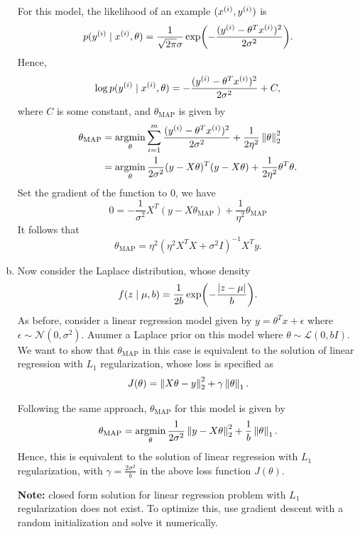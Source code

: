 \documentclass[12pt,letterpaper,boxed]{hmcpset}
\DeclareMathOperator*{\argmin}{argmin}
\newcommand{\thetamap}{\theta_{\mathrm{MAP}}}
\begin{document}
\begin{solution}
\begin{enumerate}[(a)]
    For this model, the likelihood of an example $(\xx, \yy)$ is
    \[
    p(\yy \mid \xx, \theta) = \frac{1}{\sqrt{2\pi} \sigma} \exp(-\frac{(\yy - \theta^T \xx)^2}{2\sigma^2}).
    \]
    Hence,
    \[
    \log p(\yy \mid \xx, \theta) = - \frac{(\yy - \theta^T \xx)^2}{2\sigma^2} + C,
    \]
    where $C$ is some constant, and $\theta_{\mathrm{MAP}}$ is given by
    \[
    \begin{aligned}
      \theta_{\mathrm{MAP}} &= \argmin_\theta \sum_{i=1}^m \frac{(\yy - \theta^T \xx)^2}{2\sigma^2} + \frac{1}{2\eta^2} \norm{\theta}_2^2 \\
      &= \argmin_\theta \frac{1}{2\sigma^2} (y - X\theta)^T (y - X\theta) + \frac{1}{2\eta^2} \theta^T \theta.
    \end{aligned}
    \]
    Set the gradient of the function to 0, we have
    \[
    0 = -\frac{1}{\sigma^2} X^T(y-X\thetamap) + \frac{1}{\eta^2} \thetamap
    \]
    It follows that
    \[
    \thetamap = \eta^2 (\eta^2 X^T X + \sigma^2 I)^{-1} X^T y.
    \]
    
    \item Now consider the Laplace distribution, whose density 
    \[
    f(z \mid \mu, b) = \frac{1}{2b} \exp(-\frac{\left\lvert z-\mu\right\rvert}{b}).
    \]
    As before, consider a linear regression model given by $y = \theta^T x + \epsilon$ where $\epsilon \sim \mathcal{N}(0, \sigma^2)$. Auumer a Laplace prior on this model where $\theta \sim \mathcal{L} (0, bI)$. We want to show that $\thetamap$ in this case is equivalent to the solution of linear regression with $L_1$ regularization, whose loss is specified as
    \[
    J(\theta) = \left\lVert X\theta - y\right\rVert_2^2 + \gamma \left\lVert \theta\right\rVert_1.
    \]

    Following the same approach, $\thetamap$ for this model is given by
    \[
    \begin{aligned}
      \thetamap = \argmin_\theta \frac{1}{2\sigma^2} \norm{y-X\theta}_2^2 + \frac{1}{b} \norm{\theta}_1.
    \end{aligned}
    \]
    Hence, this is equivalent to the solution of linear regression with $L_1$ regularization, with $\gamma = \frac{2\sigma^2}{b}$ in the above loss function $J(\theta)$.

    \textbf{Note:} closed form solution for linear regression problem with $L_1$ regularization does not exist. To optimize this, use gradient descent with a random initialization and solve it numerically.
  \end{enumerate}
\end{solution}
\end{document}
